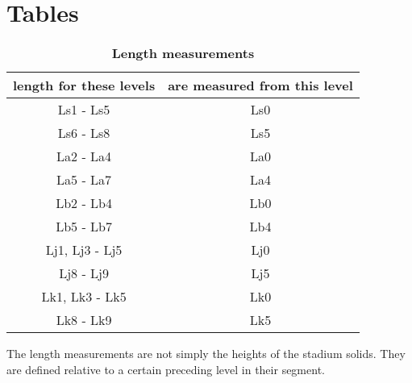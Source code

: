 \documentclass[10pt]{article}
\begin{document}
\section*{Tables}

\begin{table}[!ht]
\caption{
\bf{Length measurements}}
\begin{tabular}{|c|c|}
    \hline
    \textbf{length for these levels} & \textbf{are measured from this level}\\
    \hline
    Ls1 - Ls5 & Ls0 \\
    \hline
    Ls6 - Ls8 & Ls5 \\
    \hline
    La2 - La4 & La0 \\
    \hline
    La5 - La7 & La4 \\
    \hline
    Lb2 - Lb4 & Lb0 \\
    \hline
    Lb5 - Lb7 & Lb4 \\
    \hline
    Lj1, Lj3 - Lj5 & Lj0 \\
    \hline
    Lj8 - Lj9 & Lj5  \\
    \hline
    Lk1, Lk3 - Lk5 & Lk0 \\
    \hline
    Lk8 - Lk9 & Lk5  \\
    \hline
\end{tabular}
\begin{flushleft}The length measurements are not simply the heights of the
    stadium solids. They are defined relative to a certain preceding level in
    their segment.
\end{flushleft}
\label{tab:length}
\end{table}
\end{document}
